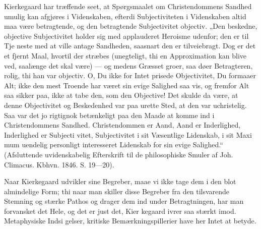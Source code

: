 \documentclass[12pt]{book}
\newcommand{\opage}[1]{\marginnote{\footnotesize\textit{[#1]}}}
\begin{document}
Kierkegaard har træffende seet, at Spørgsmaalet
om Christendommens Sandhed umulig kan afgjøres i
Videnskaben, efterdi Subjectiviteten i Videnskaben altid
maa være betragtende, og den betragtende Subjectivitet
objectiv. „Den beskedne, objective Subjectivitet holder
sig med applauderet Heroisme udenfor; den er til Tje\-%
neste med at ville antage Sandheden, saasnart den er
tilveiebragt. Dog er det et fjernt Maal, hvortil der stræbes
(unegteligt, thi en Approximation kan blive ved, saalænge
det skal være) --- og medens Græsset groer, saa døer
Betragteren, rolig, thi han var objectiv. O, Du ikke for
Intet prisede Objectivitet, Du formaaer Alt; ikke den
mest Troende har været sin evige Salighed saa vis, og
fremfor Alt saa sikker paa, ikke at tabe den, som den
Objective! Det skulde da være, at denne Objectivitet og
Beskedenhed var paa urette Sted, at den var uchristelig.
Saa var det jo rigtignok betænkeligt paa den Maade at
komme ind i Christendommens Sandhed. Christendommen
er Aand, Aand er Inderlighed, Inderlighed er Subjecti\-%
vitet, Subjectivitet i sit Væsentlige Lidenskab, i sit Maxi\-%
mum uendelig personligt interesseret Lidenskab for sin
evige Salighed.“ (Afsluttende uvidenskabelig Efterskrift
til de philosophiske Smuler af Joh. Climacus. Kbhvn.
1846. S. 19---20).

\opage{234}\setcounter{footnote}{0}%
Naar Kierkegaard udvikler sine Begreber, maae vi
ikke tage dem i den blot almindelige Form; thi naar
man skiller disse Begreber fra den tilsvarende Stemning
og stærke Pathos og drager dem ind under Betragtningen,
har man forvansket det Hele, og det er just det, Kier\-%
kegaard ivrer saa stærkt imod. Metaphysiske Indsi\-%
gelser, kritiske Bemærkningspillerier have her Intet at
betyde.
\end{document}
